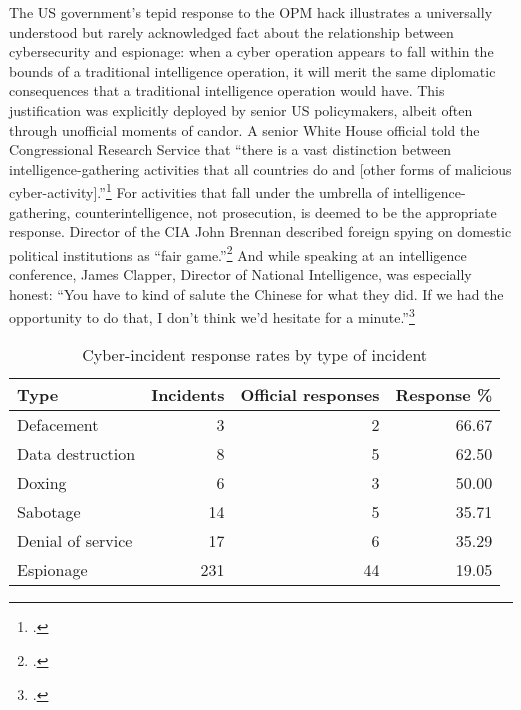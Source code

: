 \documentclass[14pt]{extarticle}
\begin{document}
The US government's tepid response to the OPM hack illustrates a universally understood but rarely acknowledged fact about the relationship between cybersecurity and espionage: when a cyber operation appears to fall within the bounds of a traditional intelligence operation, it will merit the same diplomatic consequences that a traditional intelligence operation would have. This justification was explicitly deployed by senior US policymakers, albeit often through unofficial moments of candor. A senior White House official told the Congressional Research Service that \enquote{there is a vast distinction between intelligence-gathering activities that all countries do and [other forms of malicious cyber-activity].}\footcite[In the context of the quote, the White House official is distinguishing between traditional espionage and economic espionage, the latter of which is the state-sponsored theft of trade secrets from foreign private companies in order to gain a competitive advantage in international markets.]{finklea_cyber_2015} For activities that fall under the umbrella of intelligence-gathering, counterintelligence, not prosecution, is deemed to be the appropriate response. Director of the CIA John Brennan described foreign spying on domestic political institutions as \enquote{fair game.}\footcite{sanger_u.s._2016} And while speaking at an intelligence conference, James Clapper, Director of National Intelligence, was especially honest: \enquote{You have to kind of salute the Chinese for what they did. If we had the opportunity to do that, I don’t think we’d hesitate for a minute.}\footcite{pepitone_clapper_2015}

\begin{table}[ht]
\centering
\begin{tabular}{lrrr}
  \hline
Type & Incidents & Official responses & Response \% \\
  \hline
Defacement &   3 &   2 & 66.67 \\
  Data destruction &   8 &   5 & 62.50 \\
  Doxing &   6 &   3 & 50.00 \\
  Sabotage &  14 &   5 & 35.71 \\
  Denial of service &  17 &   6 & 35.29 \\
  Espionage & 231 &  44 & 19.05 \\
   \hline
\end{tabular}
\caption{Cyber-incident response rates by type of incident}
\label{response-pct}
\end{table}
\end{document}
